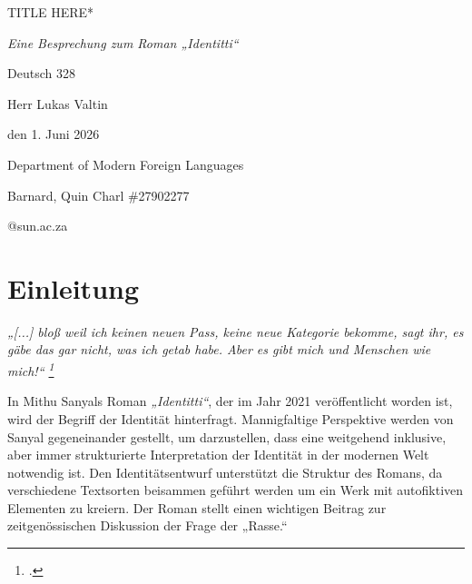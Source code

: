 \documentclass[12pt,a4paper]{article}
\makeatletter
\newcommand{\CoverCourse}{Deutsch 328}
\newcommand{\CoverInstructor}{Herr Lukas Valtin}
\newcommand{\CoverDate}{den 1. Juni 2026}
\newcommand{\CoverDepartment}{Department of Modern Foreign Languages}
\newcommand{\CoverStudent}{Barnard, Quin Charl \#27902277}
\newcommand{\CoverEmail}{27902277@sun.ac.za}
\makeatother
\begin{document}
\begin{titlepage}
\thispagestyle{empty}

\vspace*{3.55in}

{\raggedleft
    {\fontsize{31}{35}\selectfont *TITLE HERE*\par}
\par}

\vspace{0.30in}

{\raggedleft
    {\itshape\fontsize{18}{22}\selectfont Eine Besprechung zum Roman \textit{„Identitti“}\par}
\par}

\vspace{0.45in}

\begin{raggedleft}
   {\fontsize{18}{21}\selectfont \CoverCourse\par}
    \vspace{0.03in}
    {\fontsize{11}{14}\selectfont
      \CoverInstructor\par
      \CoverDate\par
      \CoverDepartment\par}
\end{raggedleft}

\vspace{0.55in}

\begin{raggedleft}
    {\fontsize{15}{18}\selectfont \CoverStudent\par}
    \vspace{0.04in}
    {\fontsize{10}{12}\selectfont \CoverEmail\par}
\end{raggedleft}
\end{titlepage}

\setcounter{page}{1}
\tableofcontents
\clearpage

\onehalfspacing

\section{Einleitung}
{\centering
\itshape
\footnotesize
„[...] bloß weil ich keinen neuen Pass, keine neue Kategorie bekomme, sagt ihr, es gäbe das gar nicht, was ich getab habe. Aber es gibt mich und Menschen wie mich!“ \footcite[275]{sanyal2021identitti}
\par}
\noindent In Mithu Sanyals Roman \textit{„Identitti“}, der im Jahr 2021 veröffentlicht worden ist, wird der Begriff der Identität hinterfragt. Mannigfaltige Perspektive werden von Sanyal gegeneinander gestellt, um darzustellen, dass eine weitgehend inklusive, aber immer strukturierte Interpretation der Identität in der modernen Welt notwendig ist. Den Identitätsentwurf unterstützt die Struktur des Romans, da verschiedene Textsorten beisammen geführt werden um ein Werk mit autofiktiven Elementen zu kreiern. Der Roman stellt einen wichtigen Beitrag zur zeitgenössischen Diskussion der Frage der „Rasse.“
\end{document}
